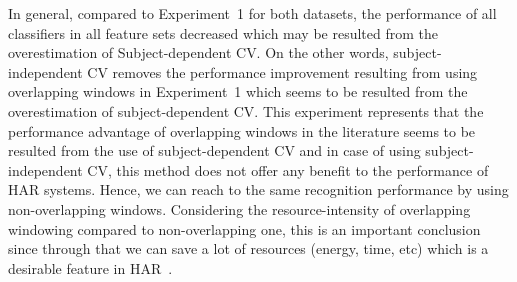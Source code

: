 \documentclass[sensors,article,submit,moreauthors,pdftex]{Definitions/mdpi}
\begin{document}
In general, compared to Experiment~1 for both datasets, the performance of all classifiers in all feature sets decreased which may be resulted from the overestimation of Subject-dependent CV. On the other words, subject-independent CV removes the performance improvement resulting from using overlapping windows in Experiment~1 which seems to be resulted from the overestimation of subject-dependent CV. This experiment represents that the performance advantage of overlapping windows in the literature seems to be resulted from the use of subject-dependent CV and in case of using subject-independent CV, this method does not offer any benefit to the performance of HAR systems. Hence, we can reach to the same recognition performance by using non-overlapping windows. Considering the resource-intensity of overlapping windowing compared to non-overlapping one,  this is an important conclusion since through that we can save a lot of resources (energy, time, etc) which is a desirable feature in HAR~\cite{lara2012survey}.   
\end{document}
